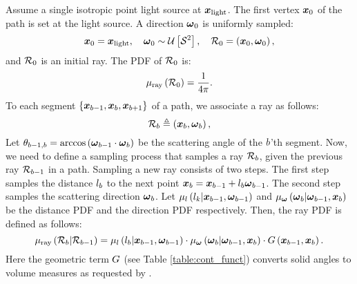 \documentclass{article}
\begin{document}
Assume a single isotropic point light source at $\boldsymbol{x}_{\text{light}}$.
The first vertex $\boldsymbol{x}_0$ of the path is set at the light source. A direction $\boldsymbol{\omega}_0$ is uniformly sampled:
\begin{equation}
    \boldsymbol{x}_0 = \boldsymbol{x}_{\text{light}}, \quad \boldsymbol{\omega}_0 \sim \mathcal{U}\left[{\mathcal{S}^2}\right], \quad   \mathcal{R}_0 =\left({\boldsymbol{x}_0, \boldsymbol{\omega}_0}\right),
\end{equation}
and $\mathcal{R}_0$ is an initial ray.
 The \ac{PDF} of $\mathcal{R}_0$ is:
\begin{equation}
    \mu_{\text{ray}}\left({\mathcal{R}_0}\right) = \frac{1}{4\pi}.
\end{equation}
To each segment $\left\{ {\boldsymbol{x}_{b-1},\boldsymbol{x}_{b},\boldsymbol{x}_{b+1}}\right\}$ of a path, we associate a ray as follows:
\begin{equation}
    \mathcal{R}_{b} \triangleq \left({\boldsymbol{x}_{b},\boldsymbol{\omega}_{b}}\right),
\end{equation}
Let $\theta_{b-1,b}=\arccos\left({\boldsymbol{\omega}_{b-1}\cdot\boldsymbol{\omega}_{b}}\right)$ be the scattering angle of the $b$'th segment.
Now, we need to define a sampling process that samples a ray $\mathcal{R}_{b}$, given the previous ray $\mathcal{R}_{b-1}$ in a path. Sampling a new ray consists of two steps. The first step samples the distance $l_{b}$ to the next point $\boldsymbol{x}_{b}=\boldsymbol{x}_{b-1}+l_{b}\boldsymbol{\omega}_{b-1}$. The second step samples the scattering direction $\boldsymbol{\omega}_{b}$.
Let $\mu_l\left({l_k|\boldsymbol{x}_{b-1},\boldsymbol{\omega}_{b-1}}\right)$ and $\mu_{\boldsymbol{\omega}}\left({\boldsymbol{\omega}_{b}|\boldsymbol{\omega}_{b-1}, \boldsymbol{x}_{b}}\right)$ be the distance \ac{PDF} and the direction \ac{PDF} respectively. Then, the ray \ac{PDF} is defined as follows:
\begin{equation}
\label{eq:semgent_sampling}
\mu_{\text{ray}}\left({\mathcal{R}_{b}|\mathcal{R}_{b-1}}\right) = \mu_{l}\left({l_{b}|\boldsymbol{x}_{b-1},\boldsymbol{\omega}_{b-1}}\right)
\cdot \mu_{\boldsymbol{\omega}}\left({\boldsymbol{\omega}_{b}|\boldsymbol{\omega}_{b-1},\boldsymbol{x}_{b}}\right)\cdot G\left({\boldsymbol{x}_{b-1},\boldsymbol{x}_{b}}\right) .
\end{equation}
Here the geometric term $G$ (see Table \ref{table:cont_funct}) converts solid angles to volume measures as requested by \eq{\ref{eq:path_integral_formulation}}.
\end{document}
